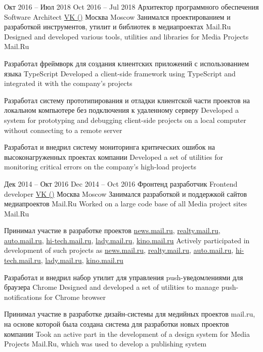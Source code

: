 \cventry
  {\lang
    {Окт 2016 – Июл 2018}
    {Oct 2016 – Jul 2018}}
  {\lang
    {Архитектор программного обеспечения}
    {Software Architect}}
  {\href{https://vk.company}{VK ({})}}
  {\lang
    {Москва}
    {Moscow}}
  {}
  {\lang
    {Занимался проектированием и разработкой инструментов, утилит и библиотек в медиапроектах Mail.Ru}
    {Designed and developed various tools, utilities and libraries for Media Projects Mail.Ru}}

\cvlistitem
  {\lang
    {Разработал фреймворк для создания клиентских приложений с использованием языка TypeScript}
    {Developed a client-side framework using TypeScript and integrated it with the company's projects}}

\cvlistitem
  {\lang
    {Разработал систему прототипирования и отладки клиентской части проектов на локальном компьютере без подключения к удаленному серверу}
    {Developed a system for prototyping and debugging client-side projects on a local computer without connecting to a remote server}}

\cvlistitem
  {\lang
    {Разработал и внедрил систему мониторинга критических ошибок на высоконагруженных проектах компании}
    {Developed a set of utilities for monitoring critical errors on the company's high-load projects}}

\cvline{}{}

\cventry
  {\lang
    {Дек 2014 – Окт 2016}
    {Dec 2014 – Oct 2016}}
  {\lang
    {Фронтенд разработчик}
    {Frontend developer}}
  {\href{https://vk.company}{VK ({})}}
  {\lang
    {Москва}
    {Moscow}}
  {}
  {\lang
    {Занимался разработкой и поддержкой сайтов медиапроектов Mail.Ru}
    {Worked on a large code base of all Media project sites Mail.Ru}}

\cvlistitem
  {\lang
    {Принимал участие в разработке проектов \href{https://news.mail.ru}{news.mail.ru}, \href{https://realty.mail.ru}{realty.mail.ru}, \href{https://auto.mail.ru}{auto.mail.ru}, \href{https://hi-tech.mail.ru}{hi-tech.mail.ru}, \href{https://lady.mail.ru}{lady.mail.ru}, \href{https://kino.mail.ru}{kino.mail.ru}}
    {Actively participated in development of such projects as \href{https://news.mail.ru}{news.mail.ru}, \href{https://realty.mail.ru}{realty.mail.ru}, \href{https://auto.mail.ru}{auto.mail.ru}, \href{https://hi-tech.mail.ru}{hi-tech.mail.ru}, \href{https://lady.mail.ru}{lady.mail.ru}, \href{https://kino.mail.ru}{kino.mail.ru}}}

\cvlistitem
  {\lang
    {Разработал и внедрил набор утилит для управления push-уведомлениями для браузера Chrome}
    {Designed and developed a set of utilities to manage push-notifications for Chrome browser}}

\cvlistitem
  {\lang
    {Принимал участие в разработке дизайн-системы для медийных проектов mail.ru, на основе которой была создана система для разработки новых проектов компании}
    {Took an active part in the development of a design system for Media Projects Mail.Ru, which was used to develop a publishing system}}